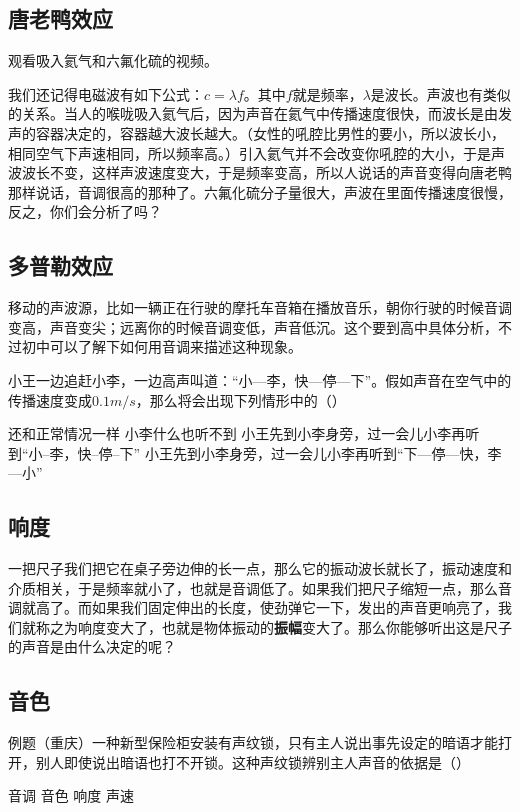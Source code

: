 \documentclass[12pt]{exam}
\begin{document}
\subsection{唐老鸭效应}
观看吸入氦气和六氟化硫的视频。

我们还记得电磁波有如下公式：$c=\lambda f$。其中$f$就是频率，$\lambda$是波长。声波也有类似的关系。当人的喉咙吸入氦气后，因为声音在氦气中传播速度很快，而波长是由发声的容器决定的，容器越大波长越大。（女性的吼腔比男性的要小，所以波长小，相同空气下声速相同，所以频率高。）引入氦气并不会改变你吼腔的大小，于是声波波长不变，这样声波速度变大，于是频率变高，所以人说话的声音变得向唐老鸭那样说话，音调很高的那种了。六氟化硫分子量很大，声波在里面传播速度很慢，反之，你们会分析了吗？


\subsection{多普勒效应}
移动的声波源，比如一辆正在行驶的摩托车音箱在播放音乐，朝你行驶的时候音调变高，声音变尖；远离你的时候音调变低，声音低沉。这个要到高中具体分析，不过初中可以了解下如何用音调来描述这种现象。

小王一边追赶小李，一边高声叫道：“小—李，快—停—下”。假如声音在空气中的传播速度变成$0.1m/s$，那么将会出现下列情形中的（\answerline*[D]）
\begin{choices}
\choice 还和正常情况一样
\choice 小李什么也听不到
\choice 小王先到小李身旁，过一会儿小李再听到“小--李，快--停--下”
\choice 小王先到小李身旁，过一会儿小李再听到“下—停—快，李—小”
\end{choices}


\subsection{响度}
一把尺子我们把它在桌子旁边伸的长一点，那么它的振动波长就长了，振动速度和介质相关，于是频率就小了，也就是音调低了。如果我们把尺子缩短一点，那么音调就高了。而如果我们固定伸出的长度，使劲弹它一下，发出的声音更响亮了，我们就称之为响度变大了，也就是物体振动的\textbf{振幅}变大了。那么你能够听出这是尺子的声音是由什么决定的呢？


\subsection{音色}
例题（重庆）一种新型保险柜安装有声纹锁，只有主人说出事先设定的暗语才能打开，别人即使说出暗语也打不开锁。这种声纹锁辨别主人声音的依据是（\answerline*[B]）

\begin{oneparchoices}
\choice 音调
\choice 音色
\choice 响度
\choice 声速
\end{oneparchoices}
\end{document}
